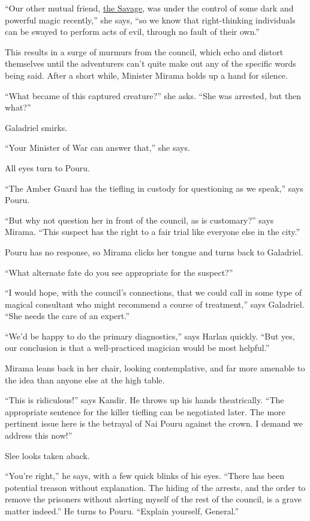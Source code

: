 \documentclass[smalldemyvopaper,11pt,twoside,onecolumn,openright,extrafontsizes]{memoir}
\begin{document}
``Our other mutual friend, \href{/characters/the-savage/}{the Savage},
was under the control of some dark and powerful magic recently,'' she
says, ``so we know that right-thinking individuals can be swayed to
perform acts of evil, through no fault of their own.''

This results in a surge of murmurs from the council, which echo and
distort themselves until the adventurers can't quite make out any of the
specific words being said. After a short while, Minister Mirama holds up
a hand for silence.

``What became of this captured creature?'' she asks. ``She was arrested,
but then what?''

Galadriel smirks.

``Your Minister of War can answer that,'' she says.

All eyes turn to Pouru.

``The Amber Guard has the tiefling in custody for questioning as we
speak,'' says Pouru.

``But why not question her in front of the council, as is customary?''
says Mirama. ``This suspect has the right to a fair trial like everyone
else in the city.''

Pouru has no response, so Mirama clicks her tongue and turns back to
Galadriel.

``What alternate fate do you see appropriate for the suspect?''

``I would hope, with the council's connections, that we could call in
some type of magical consultant who might recommend a course of
treatment,'' says Galadriel. ``She needs the care of an expert.''

``We'd be happy to do the primary diagnostics,'' says Harlan quickly.
``But yes, our conclusion is that a well-practiced magician would be
most helpful.''

Mirama leans back in her chair, looking contemplative, and far more
amenable to the idea than anyone else at the high table.

``This is ridiculous!'' says Kandir. He throws up his hands
theatrically. ``The appropriate sentence for the killer tiefling can be
negotiated later. The more pertinent issue here is the betrayal of Nai
Pouru against the crown. I demand we address this now!''

Slee looks taken aback.

``You're right,'' he says, with a few quick blinks of his eyes. ``There
has been potential treason without explanation. The hiding of the
arrests, and the order to remove the prisoners without alerting myself
of the rest of the council, is a grave matter indeed.'' He turns to
Pouru. ``Explain yourself, General.''
\end{document}
